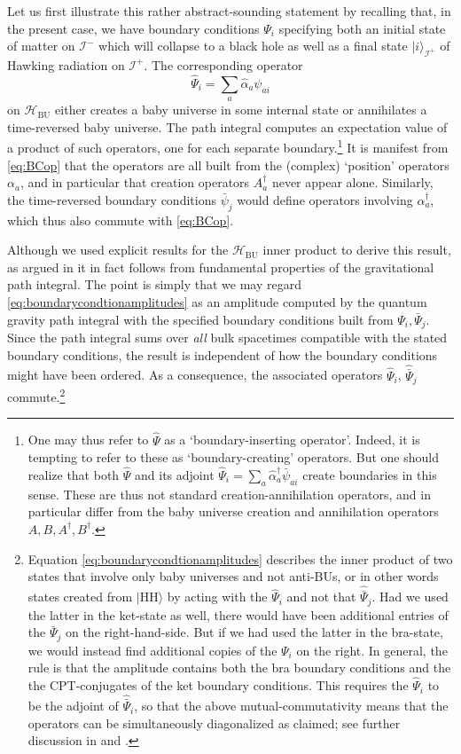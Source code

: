 \documentclass[letterpaper,12pt]{article}
\newcommand*{\hbu}{\mathcal{H}_\text{BU}} %
\newcommand*{\scri}{\mathscr{I}} %
\newcommand{\HH}{\mathrm{HH}} %
\begin{document}
Let us first illustrate this rather abstract-sounding statement by recalling that,
in the present case, we have boundary conditions $\Psi_i$ specifying both an initial state of matter  on $\scri^-$ which will collapse to a black hole as well as a final state  $|i\rangle_{\scri^+}$  of Hawking radiation  on $\scri^+$. The corresponding operator
\begin{equation}
\label{eq:BCop}
	\hat{\Psi}_i  = \sum_a\hat{\alpha}_a\psi_{ai}
\end{equation}
on $\hbu$ either creates a baby universe in some internal state or annihilates a time-reversed baby universe. The path integral computes an expectation value of a product of such operators, one for each separate boundary.\footnote{One may thus refer to $\hat{\Psi}$ as a `boundary-inserting operator'.  Indeed, it is tempting to refer to these as `boundary-creating' operators.  But one should realize that both $\hat \Psi$ and its adjoint $	\hat{\Psi}_i  = \sum_a\hat{\alpha}_a^\dagger \bar \psi_{ai}$ create boundaries in this sense.  These are thus not standard creation-annihilation operators, and in particular differ from the baby universe creation and annihilation operators $A,B, A^\dagger, B^\dagger$.} It is manifest from \eqref{eq:BCop} that the operators are all built from the (complex) `position' operators
$\alpha_a$, and in particular that creation operators $A_a^\dag$ never appear alone.  Similarly, the time-reversed boundary conditions $\bar \psi_j$ would define operators involving $\alpha_a^\dag$, which thus also commute with \eqref{eq:BCop}.

Although we used explicit results for the $\hbu$ inner product to derive this result, as argued in \cite{Marolf:2020xie} it in fact follows from fundamental properties of the gravitational path integral.  The point is simply that we may regard \eqref{eq:boundarycondtionamplitudes} as an amplitude computed by the quantum gravity path integral with the specified boundary conditions built from $\Psi_i, \bar \Psi_j$.  Since the path integral sums over \emph{all} bulk spacetimes compatible with the stated boundary conditions, the result is independent of how the boundary conditions might have been ordered.  As a consequence, the associated operators $\hat{\Psi}_i$, $\hat{\bar{\Psi}}_j$ commute.\footnote{Equation \eqref{eq:boundarycondtionamplitudes} describes the inner product of two states that involve only baby universes and not anti-BUs, or in other words states created from $|\HH\rangle$ by acting with the $\hat{\Psi}_i$ and not that $\hat{\bar{\Psi}}_j$.  Had we used the latter in the ket-state as well, there would have been additional entries of the $\bar{\Psi}_j$ on the right-hand-side.  But if we had used the latter in the bra-state, we would instead find additional copies of the $\Psi_i$ on the right.  In general, the rule is that the amplitude contains both the bra boundary conditions and the the CPT-conjugates of the ket boundary conditions. This requires the $\hat{\Psi}_i$ to be the adjoint of $\hat{\bar{\Psi}}_i$, so that the above mutual-commutativity means that the operators can be simultaneously diagonalized as claimed; see further discussion in \cite{Marolf:2020xie} and \cite{CMMR}.\label{foot:normal}}
\end{document}
